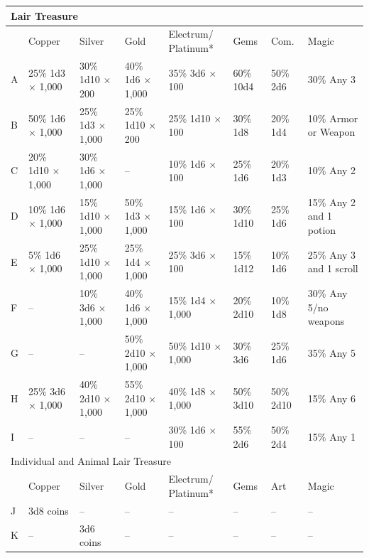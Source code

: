 \noindent
\begin{minipage}{\textwidth}

\label{treasuretype}
\noindent
\begin{tabular}{|p{}|p{}|p{}|p{}|p{}|p{}|p{}|p{}|}
\multicolumn{8}{l}{Lair Treasure} \\
\hline	
	& Copper	& Silver	& Gold	& Electrum/ Platinum*	& Gems	& Com.	& Magic \\
\hline\hline
\rowcolor[gray]{.9}A	& 25\% 1d3 $\times$ 1,000	& 30\% 1d10 $\times$ 200	& 40\% 1d6 $\times$ 1,000	& 35\% 3d6 $\times$ 100	& 60\% 10d4	& 50\% 2d6 & 30\% Any 3 \\
B	& 50\% 1d6 $\times$ 1,000	& 25\% 1d3 $\times$ 1,000	& 25\% 1d10 $\times$ 200	& 25\% 1d10 $\times$ 100	& 30\% 1d8	& 20\% 1d4	& 10\% Armor or Weapon \\
\rowcolor[gray]{.9}C	& 20\% 1d10 $\times$ 1,000	& 30\% 1d6 $\times$ 1,000	& --	& 10\% 1d6 $\times$ 100	& 25\% 1d6	& 20\% 1d3	& 10\% Any 2 \\
D	& 10\% 1d6 $\times$ 1,000	& 15\% 1d10 $\times$ 1,000	& 50\% 1d3 $\times$ 1,000	& 15\% 1d6 $\times$ 100	& 30\% 1d10	& 25\% 1d6	& 15\% Any 2 and 1 potion \\
\rowcolor[gray]{.9}E	& 5\% 1d6 $\times$ 1,000	& 25\% 1d10 $\times$ 1,000	& 25\% 1d4 $\times$ 1,000	& 25\% 3d6 $\times$ 100	& 15\% 1d12	& 10\% 1d6	& 25\% Any 3 and 1 scroll \\
F	& --	& 10\% 3d6 $\times$ 1,000	& 40\% 1d6 $\times$ 1,000	& 15\% 1d4 $\times$ 1,000	& 20\% 2d10	& 10\% 1d8	& 30\% Any 5/no weapons \\
\rowcolor[gray]{.9}G	& --	& --	& 50\% 2d10 $\times$ 1,000	& 50\% 1d10 $\times$ 1,000	& 30\% 3d6	& 25\% 1d6	& 35\% Any 5 \\
H	& 25\% 3d6 $\times$ 1,000	& 40\% 2d10 $\times$ 1,000	& 55\% 2d10 $\times$ 1,000	& 40\% 1d8 $\times$ 1,000	& 50\% 3d10	& 50\% 2d10	& 15\% Any 6 \\
\rowcolor[gray]{.9}I	& --	& --	& --	& 30\% 1d6 $\times$ 100	& 55\% 2d6	& 50\% 2d4	& 15\% Any 1 \\
\hline
\multicolumn{8}{l}{Individual and Animal Lair Treasure} \\
\hline
	& Copper	& Silver	& Gold	& Electrum/ Platinum*	& Gems	& Art	& Magic \\
\hline\hline
\rowcolor[gray]{.9}J	& 3d8 coins	& --	& --	& --	& --	& --	& -- \\
K	& --	& 3d6 coins	& --	& --	& --	& --	& -- \\

\end{tabular}
\end{minipage}
